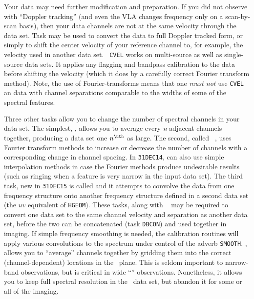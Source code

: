      Your  data may need further modification and
preparation.  If you did not observe with ``Doppler tracking'' (and
even the VLA changes frequency only on a scan-by-scan basis), then
your data channels are not at the same velocity through the data set.
Task {\tt {}} may be used to convert the data to full Doppler
tracked form, or simply to shift the center velocity of your reference
channel to, for example, the velocity used in another data set.  {\tt
CVEL} works on multi-source as well as single-source data sets.  It
applies any flagging and bandpass calibration to the data before
shifting the velocity (which it does by a carefully correct Fourier
transform method).  Note, the use of Fourier-transforms means that one
{\it must not} use {\tt CVEL} an data with channel separations
comparable to the widths of some of the spectral features.

     Three other tasks allow you to change the number of spectral
channels in your data set.  The simplest, {\tt {}}, allows
you to average every {\it n\/} adjacent channels together, producing a
data set one $n^{\uth}$ as large.  The second, called {\tt
{}}, uses Fourier transform methods to increase or decrease
the number of channels with a corresponding change in channel spacing.
In {\tt 31DEC14}, {\tt {}} can also use simple interpolation
methods in case the Fourier methods produce undesirable results (such
as ringing when a feature is very narrow in the input data set).  The
third task, new in {\tt 31DEC15} is called {\tt {}} and it
attempts to convolve the data from one frequency structure onto
another frequency structure defined in a second data set (the $uv$
equivalent of {\tt HGEOM})\@.  These tasks, along with {\tt
{}} may be required to convert one data set to the same
channel velocity and separation as another data set, before the two
can be concatenated (task {\tt DBCON}) and used together in imaging.
If simple frequency smoothing is needed, the calibration routines will
apply various convolutions to the spectrum under control of the adverb
{\tt SMOOTH}\@.  {\tt {}}, allows you to ``average''
channels together by gridding them into the correct
(channel-dependent) locations in the \uv\ plane.  This is seldom
important to narrow-band observations, but is critical in wide
``'' observations.  Nonetheless, it allows
you to keep full spectral resolution in the \uv\ data set, but abandon
it for some or all of the imaging.


